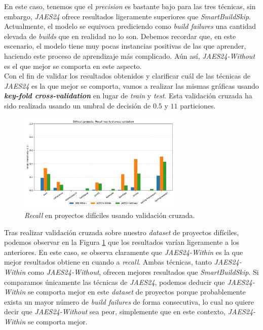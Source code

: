 En este caso, tenemos que el \textit{precision} es bastante bajo para las tres técnicas, sin
embargo, \textit{JAES24} ofrece resultados ligeramente superiores que \textit{SmartBuildSkip}.
Actualmente, el modelo se equivoca prediciendo como \textit{build failures} una cantidad elevada
de \textit{builds} que en realidad no lo son. Debemos recordar que, en este escenario, el modelo
tiene muy pocas instancias positivas de las que aprender, haciendo este proceso de aprendizaje
más complicado. Aún así, \textit{JAES24-Without} es el que mejor se comporta en este aspecto.\\

Con el fin de validar los resultados obtenidos y clarificar cuál de las técnicas de \textit{JAES24}
es la que mejor se comporta, vamos a realizar las mismas gráficas usando \textbf{\textit{key-fold
cross-validation}} en lugar de \textit{train} y \textit{test}. Esta validación cruzada ha sido
realizada usando un umbral de decisión de $0.5$ y $11$ particiones.

\begin{figure}[H]
    \centering
    \includegraphics[width=0.7\textwidth]{images/Difficult projects: Recall key-fold cross validation.pdf}
    \caption{\textit{Recall} en proyectos difíciles usando validación cruzada.}
    \label{fig:key-fold_recall_difficult_projects}
\end{figure}

Tras realizar validación cruzada sobre nuestro \textit{dataset} de proyectos difíciles, podemos
observar en la Figura \ref{fig:key-fold_recall_difficult_projects} que los resultados varían
ligeramente a los anteriores. En este caso, se observa claramente que \textit{JAES24-Within} es
la que mejor resultados obtiene en cuando a \textit{recall}. Ambas técnicas, tanto
\textit{JAES24-Within} como \textit{JAES24-Without}, ofrecen mejores resultados que
\textit{SmartBuildSkip}. Si comparamos únicamente las técnicas de \textit{JAES24}, podemos deducir
que \textit{JAES24-Within} se comporta mejor en este \textit{dataset} de proyectos porque
probablemente exista un mayor número de \textit{build failures} de forma consecutiva, lo cual no
quiere decir que \textit{JAES24-Without} sea peor, simplemente que en este contexto, \textit{JAES24-Within}
se comporta mejor.\\

